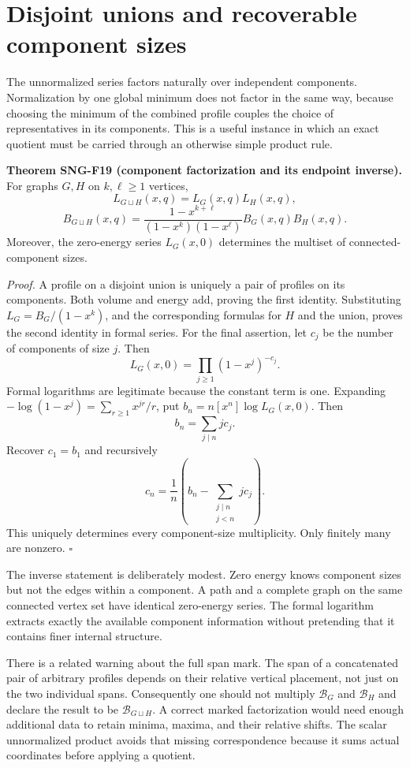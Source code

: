 \documentclass[
  11pt,
  a4paper,
]{report}
\begin{document}
\hypertarget{disjoint-unions-and-recoverable-component-sizes}{%
\section{Disjoint unions and recoverable component
sizes}\label{disjoint-unions-and-recoverable-component-sizes}}

The unnormalized series factors naturally over independent components.
Normalization by one global minimum does not factor in the same way,
because choosing the minimum of the combined profile couples the choice
of representatives in its components. This is a useful instance in which
an exact quotient must be carried through an otherwise simple product
rule.

\textbf{Theorem SNG-F19 (component factorization and its endpoint
inverse).} For graphs \(G,H\) on \(k,\ell\ge1\) vertices, \[
L_{G\sqcup H}(x,q)=L_G(x,q)L_H(x,q),
\] \[
B_{G\sqcup H}(x,q)
=\frac{1-x^{k+\ell}}{(1-x^k)(1-x^\ell)}B_G(x,q)B_H(x,q).
\] Moreover, the zero-energy series \(L_G(x,0)\) determines the multiset
of connected-component sizes.

\emph{Proof.} A profile on a disjoint union is uniquely a pair of
profiles on its components. Both volume and energy add, proving the
first identity. Substituting \(L_G=B_G/(1-x^k)\), and the corresponding
formulas for \(H\) and the union, proves the second identity in formal
series. For the final assertion, let \(c_j\) be the number of components
of size \(j\). Then \[
L_G(x,0)=\prod_{j\ge1}(1-x^j)^{-c_j}.
\] Formal logarithms are legitimate because the constant term is one.
Expanding \(-\log(1-x^j)=\sum_{r\ge1}x^{jr}/r\), put
\(b_n=n[x^n]\log L_G(x,0)\). Then \[
b_n=\sum_{j\mid n}j c_j.
\] Recover \(c_1=b_1\) and recursively \[
c_n=\frac1n\left(b_n-\sum_{\substack{j\mid n\\j<n}}j c_j\right).
\] This uniquely determines every component-size multiplicity. Only
finitely many are nonzero. \(\square\)

The inverse statement is deliberately modest. Zero energy knows
component sizes but not the edges within a component. A path and a
complete graph on the same connected vertex set have identical
zero-energy series. The formal logarithm extracts exactly the available
component information without pretending that it contains finer internal
structure.

There is a related warning about the full span mark. The span of a
concatenated pair of arbitrary profiles depends on their relative
vertical placement, not just on the two individual spans. Consequently
one should not multiply \(\mathcal B_G\) and \(\mathcal B_H\) and
declare the result to be \(\mathcal B_{G\sqcup H}\). A correct marked
factorization would need enough additional data to retain minima,
maxima, and their relative shifts. The scalar unnormalized product
avoids that missing correspondence because it sums actual coordinates
before applying a quotient.
\end{document}
